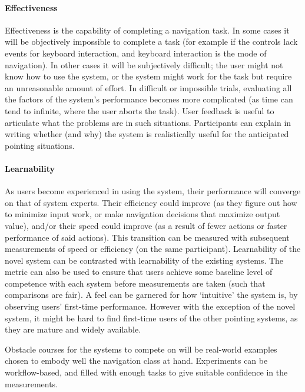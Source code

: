 \documentclass[a4paper, 11pt]{article}
\begin{document}
\paragraph{Effectiveness}
Effectiveness is the capability of completing a navigation task. In some cases it will be objectively impossible to complete a task (for example if the controls lack events for keyboard interaction, and keyboard interaction is the mode of navigation). In other cases it will be subjectively difficult; the user might not know how to use the system, or the system might work for the task but require an unreasonable amount of effort. In difficult or impossible trials, evaluating all the factors of the system's performance becomes more complicated (as time can tend to infinite, where the user aborts the task). User feedback is useful to articulate what the problems are in such situations. Participants can explain in writing whether (and why) the system is realistically useful for the anticipated pointing situations.

\paragraph{Learnability}
As users become experienced in using the system, their performance will converge on that of system experts. Their efficiency could improve (as they figure out how to minimize input work, or make navigation decisions that maximize output value), and/or their speed could improve (as a result of fewer actions or faster performance of said actions). This transition can be measured with subsequent measurements of speed or efficiency (on the same participant). Learnability of the novel system can be contrasted with learnability of the existing systems. The metric can also be used to ensure that users achieve some baseline level of competence with each system before measurements are taken (such that comparisons are fair).
A feel can be garnered for how `intuitive' the system is, by observing users' first-time performance. However with the exception of the novel system, it might be hard to find first-time users of the other pointing systems, as they are mature and widely available.

Obstacle courses for the systems to compete on will be real-world examples chosen to embody well the navigation class at hand. Experiments can be workflow-based, and filled with enough tasks to give suitable confidence in the measurements.



\end{document}
